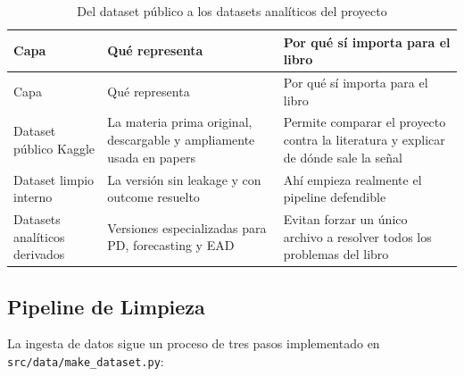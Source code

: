 \documentclass[
  spanish,
  11pt,
  letterpaper,
]{scrbook}
\theoremstyle{plain}
\theoremstyle{remark}
\begin{document}
\begin{longtable}[]{@{}
  >{\raggedright\arraybackslash}p{}
  >{\raggedright\arraybackslash}p{}
  >{\raggedright\arraybackslash}p{}@{}}
\caption{Del dataset público a los datasets analíticos del
proyecto}\label{tbl-public-to-analytic}\tabularnewline
\toprule\noalign{}
\begin{minipage}[b]{\linewidth}\raggedright
Capa
\end{minipage} & \begin{minipage}[b]{\linewidth}\raggedright
Qué representa
\end{minipage} & \begin{minipage}[b]{\linewidth}\raggedright
Por qué sí importa para el libro
\end{minipage} \\
\midrule\noalign{}
\endfirsthead
\toprule\noalign{}
\begin{minipage}[b]{\linewidth}\raggedright
Capa
\end{minipage} & \begin{minipage}[b]{\linewidth}\raggedright
Qué representa
\end{minipage} & \begin{minipage}[b]{\linewidth}\raggedright
Por qué sí importa para el libro
\end{minipage} \\
\midrule\noalign{}
\endhead
\bottomrule\noalign{}
\endlastfoot
Dataset público Kaggle & La materia prima original, descargable y
ampliamente usada en papers & Permite comparar el proyecto contra la
literatura y explicar de dónde sale la señal \\
Dataset limpio interno & La versión sin leakage y con outcome resuelto &
Ahí empieza realmente el pipeline defendible \\
Datasets analíticos derivados & Versiones especializadas para PD,
forecasting y EAD & Evitan forzar un único archivo a resolver todos los
problemas del libro \\
\end{longtable}

\subsection{Pipeline de Limpieza}\label{pipeline-de-limpieza}

La ingesta de datos sigue un proceso de tres pasos implementado en
\texttt{src/data/make\_dataset.py}:
\end{document}
